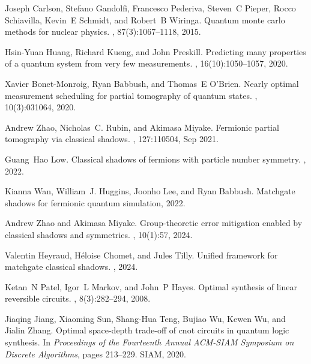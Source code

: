 \documentclass[showpacs,twocolumn,aps,prx,long bibliography,superscriptaddress,notitlepage]{revtex4-1}
\begin{document}
\begin{thebibliography}{10}
Joseph Carlson, Stefano Gandolfi, Francesco Pederiva, Steven~C Pieper, Rocco
  Schiavilla, Kevin~E Schmidt, and Robert~B Wiringa.
\newblock Quantum monte carlo methods for nuclear physics.
, 87(3):1067--1118, 2015.

Hsin-Yuan Huang, Richard Kueng, and John Preskill.
\newblock Predicting many properties of a quantum system from very few
  measurements.
, 16(10):1050--1057, 2020.

Xavier Bonet-Monroig, Ryan Babbush, and Thomas~E O’Brien.
\newblock Nearly optimal measurement scheduling for partial tomography of
  quantum states.
, 10(3):031064, 2020.

Andrew Zhao, Nicholas~C. Rubin, and Akimasa Miyake.
\newblock Fermionic partial tomography via classical shadows.
, 127:110504, Sep 2021.

Guang~Hao Low.
\newblock Classical shadows of fermions with particle number symmetry.
, 2022.

Kianna Wan, William~J. Huggins, Joonho Lee, and Ryan Babbush.
\newblock Matchgate shadows for fermionic quantum simulation, 2022.

Andrew Zhao and Akimasa Miyake.
\newblock Group-theoretic error mitigation enabled by classical shadows and symmetries.
, 10(1):57, 2024.

Valentin Heyraud, H{\'e}loise Chomet, and Jules Tilly.
\newblock Unified framework for matchgate classical shadows.
, 2024.

Ketan~N Patel, Igor~L Markov, and John~P Hayes.
\newblock Optimal synthesis of linear reversible circuits.
, 8(3):282--294, 2008.

Jiaqing Jiang, Xiaoming Sun, Shang-Hua Teng, Bujiao Wu, Kewen Wu, and Jialin
  Zhang.
\newblock Optimal space-depth trade-off of cnot circuits in quantum logic
  synthesis.
\newblock In {\em Proceedings of the Fourteenth Annual ACM-SIAM Symposium on
  Discrete Algorithms}, pages 213--229. SIAM, 2020.


\end{thebibliography}
\end{document}
